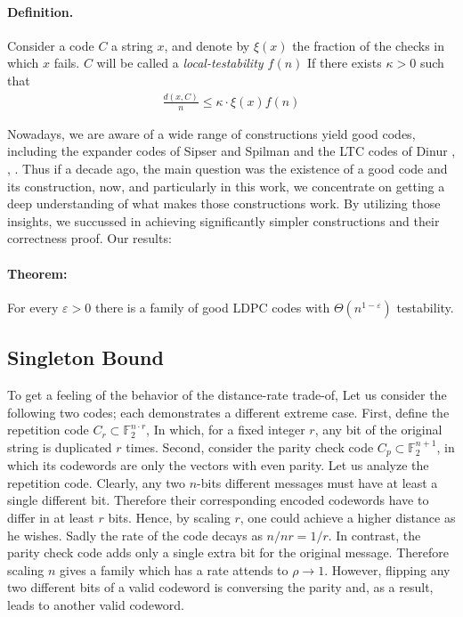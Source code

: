 \documentclass{article}
\begin{document}
\begin{multicols*}{2}
  \paragraph{Definition.} Consider a code $C$  a string $x$, and denote by $\xi\left( x \right)$ the fraction of the checks in which $x$ fails. $C$ will be called a \textit{local-testability $f\left( n \right)$} If there exists $\kappa > 0$ such that 
  \begin{equation*}
    \begin{split}
      \frac{d\left( x, C \right)}{n} \le \kappa \cdot  \xi\left( x \right) f\left( n \right)
    \end{split}
  \end{equation*}



  Nowadays, we are aware of a wide range of constructions yield good codes, including the expander codes of Sipser and Spilman \cite{ExpanderCodes} and the LTC codes of Dinur \cite{Dinur}, \cite{Pavel}, \cite{leverrier2022quantum}. Thus if a decade ago, the main question was the existence of a good code and its construction, now, and particularly in this work, we concentrate on getting a deep understanding of what makes those constructions work. By utilizing those insights, we succussed in achieving significantly simpler constructions and their correctness proof. Our results: 

  \paragraph{Theorem:} For every $\varepsilon > 0 $ there is a family of good LDPC codes with $\Theta\left( n^{1-\varepsilon} \right)$ testability.     

  \subsection{Singleton Bound}  
  To get a feeling of the behavior of the distance-rate trade-of, Let us consider the following two codes; each demonstrates a different extreme case. First, define the repetition code $C_{r} \subset \mathbb{F}_{2}^{n \cdot r}$, In which, for a fixed integer $r$, any bit of the original string is duplicated $r$ times. Second, consider the parity check code $C_{p} \subset \mathbb{F}_{2}^{n+1}$, in which its codewords are only the vectors with even parity. Let us analyze the repetition code. Clearly, any two $n$-bits different messages must have at least a single different bit. Therefore their corresponding encoded codewords have to differ in at least $r$ bits. Hence, by scaling $r$, one could achieve a higher distance as he wishes. Sadly the rate of the code decays as $n/nr = 1/r$. In contrast, the parity check code adds only a single extra bit for the original message. Therefore scaling $n$ gives a family which has a rate attends to $\rho \rightarrow 1$. However, flipping any two different bits of a valid codeword is conversing the parity and, as a result, leads to another valid codeword.


\end{multicols*}
\end{document}
